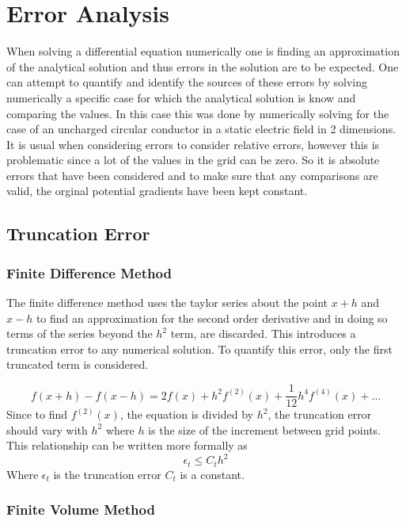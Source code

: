 \documentclass[aps,twocolumn,pre,nofootinbib]{revtex4}
\begin{document}
\section{Error Analysis \label{sec:unc}}

When solving a differential equation numerically one is finding an approximation of the analytical solution and thus errors in the solution are to be expected.
One can attempt to quantify and identify the sources of these errors by solving numerically a specific case for which the analytical solution is know and comparing the values. In this case this was done by numerically solving for the case of an uncharged circular conductor in a static electric field in 2 dimensions. It is usual when considering errors to consider relative errors, however this is problematic since a lot of the values in the grid can be zero. So it is absolute errors that have been considered and to make sure that any comparisons are valid, the orginal potential gradients have been kept constant.


\subsection{Truncation Error}

\subsubsection{Finite Difference Method}

The finite difference method uses the taylor series about the point \(x+h\) and \(x-h\) to find an approximation for the second order derivative and in doing so terms of the series beyond the \(h^2\) term, are discarded. This introduces a truncation error to any numerical solution. To quantify this error, only the first truncated term is considered. 

\[f(x+h)-f(x-h) = 2f(x) + h^2f^{(2)}(x) + \frac{1}{12}h^4f^{(4)}(x) + \dots \]
Since to find \(f^{(2)}(x) \), the equation is divided by \(h^2\), the truncation error should vary with \(h^2\) where \(h\) is the size of the increment between grid points. This relationship can be written more formally as
\[\epsilon_{t} \leq C_th^2 \]
Where \(\epsilon_{t}\) is the truncation error \(C_t\) is a constant.



\subsubsection{Finite Volume Method}
\end{document}
